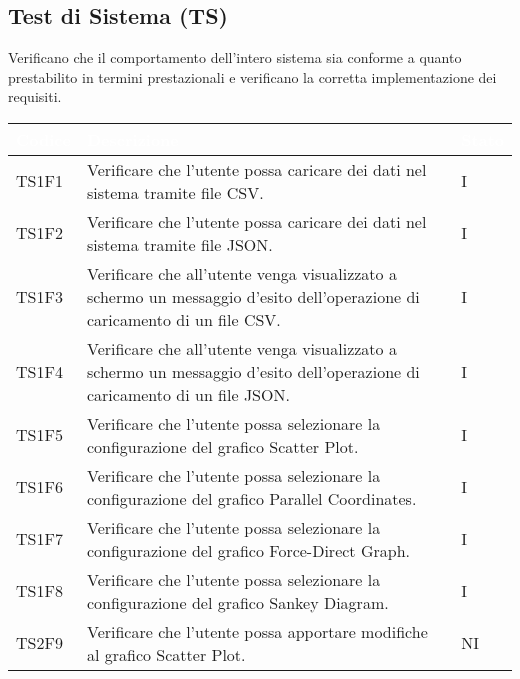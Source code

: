     \subsection{Test di Sistema (TS)} Verificano che il comportamento dell'intero sistema sia conforme a quanto prestabilito in termini prestazionali e verificano la corretta implementazione dei requisiti.
    \begin{center}
        \renewcommand\arraystretch{1.5}
        \centering
        \begin{longtable}{|p{1.5cm}|p{11cm}|p{1cm}|}
        \hline
        \rowcolor[HTML]{036400}
        \textcolor{white}{\textbf{Codice}} & \textcolor{white}{\textbf{Descrizione}} & \textcolor{white}{\textbf{Stato}} \\ \hline
            \rowcolor[HTML]{C0C0C0}
            TS1F1 & Verificare che l’utente possa caricare dei dati nel sistema tramite file CSV. & I\\ \hline
            \rowcolor[HTML]{EFEFEF}
            TS1F2 & Verificare che l’utente possa caricare dei dati nel sistema tramite file JSON. & I\\ \hline
            \rowcolor[HTML]{C0C0C0}
            TS1F3 & Verificare che all’utente venga visualizzato a schermo un messaggio d’esito dell’operazione di caricamento di un file CSV.& I\\ \hline
            \rowcolor[HTML]{EFEFEF}
            TS1F4 & Verificare che all’utente venga visualizzato a schermo un messaggio d’esito dell’operazione di caricamento di un file JSON.& I\\ \hline
            \rowcolor[HTML]{C0C0C0}
            TS1F5 & Verificare che l’utente possa selezionare la configurazione del grafico Scatter Plot. & I\\ \hline
            \rowcolor[HTML]{EFEFEF}
            TS1F6 & Verificare che l’utente possa selezionare la configurazione del grafico Parallel Coordinates. & I\\ \hline
            \rowcolor[HTML]{C0C0C0}
            TS1F7 & Verificare che l’utente possa selezionare la configurazione del grafico Force-Direct Graph. & I\\ \hline
            \rowcolor[HTML]{EFEFEF}
            TS1F8 & Verificare che l’utente possa selezionare la configurazione del grafico Sankey Diagram. & I\\ \hline
            \rowcolor[HTML]{C0C0C0}
            TS2F9 & Verificare che l’utente possa apportare modifiche al grafico Scatter Plot. & NI\\ \hline

\end{longtable}
\end{center}
